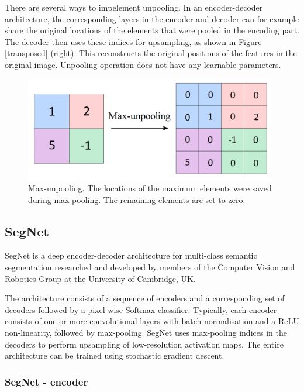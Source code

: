 There are several ways to impelement unpooling. In an encoder-decoder architecture, the corresponding layers in the encoder and decoder can for example share the original locations of the elements that were pooled in the encoding part. The decoder then uses these indices for upsampling, as shown in Figure \ref{transposed} (right). This reconstructs the original positions of the features in the original image. Unpooling operation does not have any learnable parameters. 

\vspace{4mm}
\begin{figure}[h]
	\begin{center}
		\includegraphics*[width=11cm, keepaspectratio]{obr/unpool.png}
	\end{center}
	\vspace{4mm}
	\caption{Max-unpooling. The locations of the maximum elements were saved during max-pooling. The remaining elements are set to zero.} 
	\label{unpool}
\end{figure}

\subsection{SegNet}

SegNet is a deep encoder-decoder architecture for multi-class semantic segmentation researched and developed by members of the Computer Vision and Robotics Group at the University of Cambridge, UK. \cite{segnet_tut}

The architecture consists of a sequence of encoders and a corresponding set of decoders followed by a pixel-wise Softmax classifier. Typically, each encoder consists of one or more convolutional layers with batch normalisation and a ReLU non-linearity, followed by max-pooling. SegNet uses max-pooling indices in the decoders to perform upsampling of low-resolution activation maps. The entire architecture can be trained using stochastic gradient descent. \cite{segnet_tut}

\subsubsection{SegNet - encoder}

